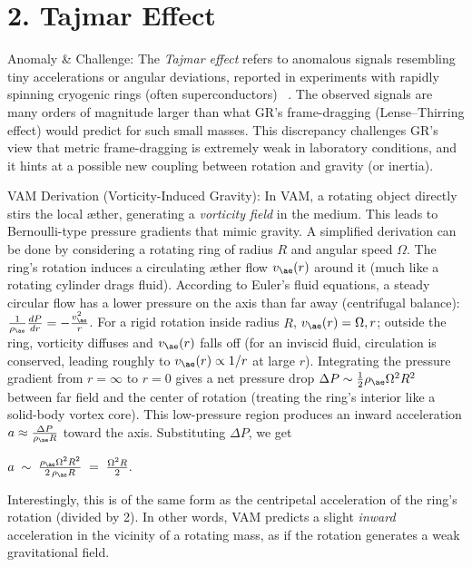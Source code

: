 \documentclass[a4paper, aps,preprint,superscriptaddress, 12pt]{revtex4}
\begin{document}
\section*{2. Tajmar Effect}

Anomaly \& Challenge: The \textit{Tajmar effect} refers to anomalous signals resembling tiny accelerations or angular deviations, reported in experiments with rapidly spinning cryogenic rings (often superconductors)~\cite{Iskandarani2025b} . The observed signals are many orders of magnitude larger than what GR’s frame-dragging (Lense–Thirring effect) would predict for such small masses. This discrepancy challenges GR’s view that metric frame-dragging is extremely weak in laboratory conditions, and it hints at a possible new coupling between rotation and gravity (or inertia).


VAM Derivation (Vorticity-Induced Gravity): In VAM, a rotating object directly stirs the local æther, generating a \textit{vorticity field} in the medium. This leads to Bernoulli-type pressure gradients that mimic gravity. A simplified derivation can be done by considering a rotating ring of radius $R$ and angular speed $\Omega$. The ring’s rotation induces a circulating æther flow $v_{\ae}(r)$ around it (much like a rotating cylinder drags fluid). According to Euler’s fluid equations, a steady circular flow has a lower pressure on the axis than far away (centrifugal balance): $\frac{1}{\rho_{\ae}}\frac{dP}{dr} = -\frac{v_{\ae}^2}{r}$. For a rigid rotation inside radius $R$, $v_{\ae}(r)=\Omega,r$; outside the ring, vorticity diffuses and $v_{\ae}(r)$ falls off (for an inviscid fluid, circulation is conserved, leading roughly to $v_{\ae}(r)\propto 1/r$ at large $r$). Integrating the pressure gradient from $r=\infty$ to $r=0$ gives a net pressure drop $\Delta P \sim \frac{1}{2}\rho_{\ae}\Omega^2 R^2$ between far field and the center of rotation (treating the ring’s interior like a solid-body vortex core). This low-pressure region produces an inward acceleration $a \approx \frac{\Delta P}{\rho_{\ae}R}$ toward the axis. Substituting $\Delta P$, we get

$a \;\sim\; \frac{\rho_{\ae}\Omega^2 R^2}{2\,\rho_{\ae}R} \;=\; \frac{\Omega^2 R}{2}.$

Interestingly, this is of the same form as the centripetal acceleration of the ring’s rotation (divided by 2). In other words, VAM predicts a slight \textit{inward} acceleration in the vicinity of a rotating mass, as if the rotation generates a weak gravitational field.
\end{document}
